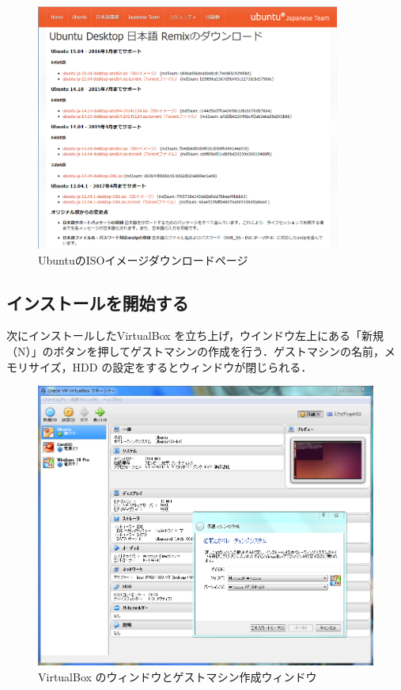 \begin{figure}[H]
\centering
\includegraphics[width=10cm]{UbuntuDL.png}
\caption{UbuntuのISOイメージダウンロードページ}\label{サンプル図}
\end{figure}





\subsection{インストールを開始する}

次にインストールしたVirtualBox を立ち上げ，ウインドウ左上にある「新規（N）」のボタンを押してゲストマシンの作成を行う．ゲストマシンの名前，メモリサイズ，HDD の設定をするとウィンドウが閉じられる．

\begin{figure}[H]
\centering
\includegraphics[width=12cm]{VBoxWindow.PNG}
\caption{VirtualBox のウィンドウとゲストマシン作成ウィンドウ}\label{サンプル図}
\end{figure}

